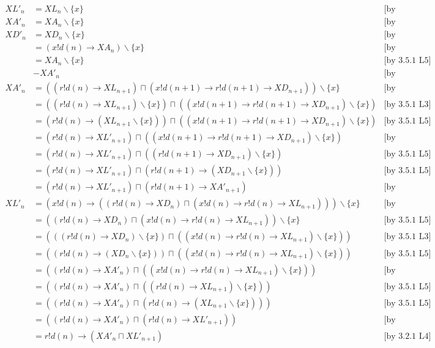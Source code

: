 \documentclass[a4paper, 10pt]{article}
\newcommand{\how}[1]{\text{[#1]}}
\newcommand{\bx}{\backslash \{x\}}
\begin{document}
\begin{align*}
  XL'_n &= XL_n \bx & \how{by definition} \\
  XA'_n &= XA_n \bx &\how{by definition} \\
  XD'_n &= XD_n \bx  & \how{by definition}\\
  &= (x!d(n) \to XA_n) \bx & \how{by expansion} \\
  &= XA_n \bx & \how{by 3.5.1 L5} \\
  &- XA'_n & \how{by substitution} \\
  XA'_n &= ((r!d(n) \to XL_{n+1}) \sqcap
  (x!d(n+1) \to r!d(n+1) \to XD_{n+1})) \bx
  &\how{by definition} \\
  &= ((r!d(n) \to XL_{n+1}) \bx) \sqcap ((x!d(n+1) \to r!d(n+1) \to
  XD_{n+1}) \bx) &\how{by 3.5.1 L3} \\
  &= (r!d(n) \to (XL_{n+1} \bx)) \sqcap ((x!d(n+1) \to r!d(n+1) \to
  XD_{n+1}) \bx) &\how{by 3.5.1 L5} \\
  &= (r!d(n) \to XL'_{n+1}) \sqcap ((x!d(n+1) \to r!d(n+1) \to
  XD_{n+1}) \bx) &\how{by substitution} \\
  &= (r!d(n) \to XL'_{n+1}) \sqcap ((r!d(n+1) \to
  XD_{n+1}) \bx) &\how{by 3.5.1 L5} \\
  &= (r!d(n) \to XL'_{n+1}) \sqcap (r!d(n+1) \to
  (XD_{n+1} \bx)) &\how{by 3.5.1 L5} \\
  &= (r!d(n) \to XL'_{n+1}) \sqcap (r!d(n+1) \to
  XA'_{n+1}) &\how{by substitution} \\
  XL'_n &= (x!d(n) \to ((r!d(n) \to XD_n) \sqcap (x!d(n) \to r!d(n)
  \to XL_{n+1}))) \bx & \how{by definition} \\
  &= ((r!d(n) \to XD_n) \sqcap (x!d(n) \to r!d(n)
  \to XL_{n+1})) \bx & \how{by 3.5.1 L5} \\
  &= (((r!d(n) \to XD_n) \bx) \sqcap ((x!d(n) \to r!d(n) \to XL_{n+1})
  \bx)) & \how{by 3.5.1 L3} \\
  &= ((r!d(n) \to (XD_n \bx)) \sqcap ((x!d(n) \to r!d(n) \to XL_{n+1})
  \bx)) & \how{by 3.5.1 L5} \\
  &= ((r!d(n) \to XA'_n) \sqcap ((x!d(n) \to r!d(n) \to XL_{n+1})
  \bx)) & \how{by substitution} \\
  &= ((r!d(n) \to XA'_n) \sqcap ((r!d(n) \to XL_{n+1})
  \bx)) & \how{by 3.5.1 L5} \\
  &= ((r!d(n) \to XA'_n) \sqcap (r!d(n) \to (XL_{n+1}
  \bx))) & \how{by 3.5.1 L5} \\
  &= ((r!d(n) \to XA'_n) \sqcap (r!d(n) \to XL'_{n+1})) & \how{by
    substitution} \\
  &= r!d(n) \to (XA'_n \sqcap XL'_{n+1}) & \how{by 3.2.1 L4} \\
\end{align*}
\end{document}
